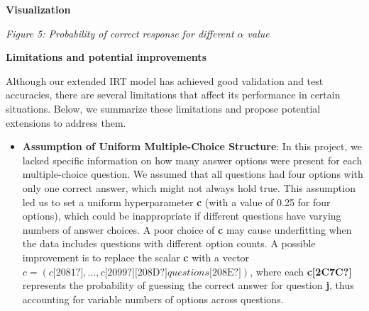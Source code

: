 \documentclass[letterpaper]{article}
\begin{document}
\bigskip


\bigskip


\bigskip

\textbf{Visualization}


\bigskip




{\centering
\textit{Figure 5: Probability of correct response for different $\alpha $ value}
\par}


\bigskip


\bigskip


\bigskip

\clearpage
\textbf{Limitations and potential improvements}

Although our extended IRT model has achieved good validation and test accuracies, there are several limitations that
affect its performance in certain situations. Below, we summarize these limitations and propose potential extensions to
address them.


\bigskip

\begin{itemize}[series=listWWNumxi,label=[F0B7?]]
\item \textbf{Assumption of Uniform Multiple-Choice Structure}: In this project, we lacked specific information on how
many answer options were present for each multiple-choice question. We assumed that all questions had four options with
only one correct answer, which might not always hold true. This assumption led us to set a uniform hyperparameter
\textbf{c} (with a value of 0.25 for four options), which could be inappropriate if different questions have varying
numbers of answer choices. A poor choice of \textbf{c} may cause underfitting when the data includes questions with
different option counts. A possible improvement is to replace the scalar \textbf{c} with a vector 
$c=(c\text{[2081?]},...,\mathit{c\text{[2099?]}}\text{[208D?]}\mathit{questions}\text{[208E?]})$, where each
\textbf{c[2C7C?]} represents the probability of guessing the correct answer for question \textbf{j}, thus accounting
for variable numbers of options across questions.
\end{itemize}
\end{document}
